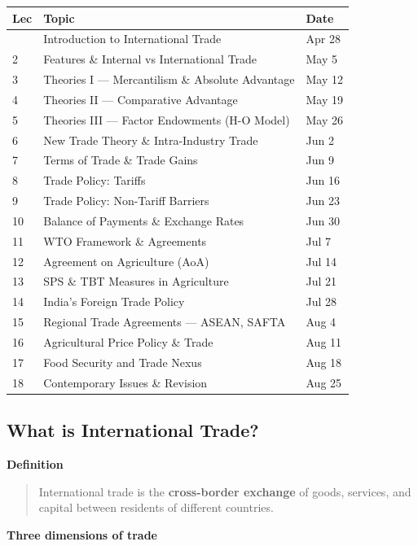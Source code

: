 \documentclass[
  letterpaper,
  DIV=11,
  numbers=noendperiod]{scrartcl}
\begin{document}
\begin{longtable}[]{@{}lll@{}}
\toprule\noalign{}
Lec & Topic & Date \\
\midrule\noalign{}
\endhead
\bottomrule\noalign{}
\endlastfoot
1 & Introduction to International Trade & Apr 28 \\
2 & Features \& Internal vs International Trade & May 5 \\
3 & Theories I --- Mercantilism \& Absolute Advantage & May 12 \\
4 & Theories II --- Comparative Advantage & May 19 \\
5 & Theories III --- Factor Endowments (H-O Model) & May 26 \\
6 & New Trade Theory \& Intra-Industry Trade & Jun 2 \\
7 & Terms of Trade \& Trade Gains & Jun 9 \\
8 & Trade Policy: Tariffs & Jun 16 \\
9 & Trade Policy: Non-Tariff Barriers & Jun 23 \\
10 & Balance of Payments \& Exchange Rates & Jun 30 \\
11 & WTO Framework \& Agreements & Jul 7 \\
12 & Agreement on Agriculture (AoA) & Jul 14 \\
13 & SPS \& TBT Measures in Agriculture & Jul 21 \\
14 & India's Foreign Trade Policy & Jul 28 \\
15 & Regional Trade Agreements --- ASEAN, SAFTA & Aug 4 \\
16 & Agricultural Price Policy \& Trade & Aug 11 \\
17 & Food Security and Trade Nexus & Aug 18 \\
18 & Contemporary Issues \& Revision & Aug 25 \\
\end{longtable}

\subsection{What is International
Trade?}\label{what-is-international-trade}

\textbf{Definition}

\begin{quote}
International trade is the \textbf{cross-border exchange} of goods,
services, and capital between residents of different countries.
\end{quote}

\textbf{Three dimensions of trade}
\end{document}
